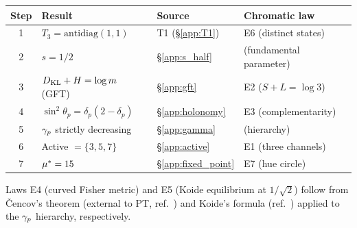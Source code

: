 \documentclass[12pt,a4paper]{article}
\begin{document}
\begin{center}
\small
\begin{tabular}{clll}
\toprule
\textbf{Step} & \textbf{Result} & \textbf{Source} & \textbf{Chromatic law} \\
\midrule
1 & $T_3 = \mathrm{antidiag}(1,1)$ & T1 (\S\ref{app:T1}) & E6 (distinct states) \\
2 & $s = 1/2$ & \S\ref{app:s_half} & (fundamental parameter) \\
3 & $D_{\mathrm{KL}} + H = \log m$ (GFT) & \S\ref{app:gft} & E2 ($S + L = \log 3$) \\
4 & $\sin^2\!\theta_p = \delta_p(2-\delta_p)$ & \S\ref{app:holonomy} & E3 (complementarity) \\
5 & $\gamma_{p}$ strictly decreasing & \S\ref{app:gamma} & (hierarchy) \\
6 & Active $= \{3,5,7\}$ & \S\ref{app:active} & E1 (three channels) \\
7 & ${\mu^{*}} = 15$ & \S\ref{app:fixed_point} & E7 (hue circle) \\
\bottomrule
\end{tabular}
\end{center}

\noindent
Laws E4 (curved Fisher metric) and E5 (Koide equilibrium at
$1/\sqrt{2}$) follow from \v{C}encov's theorem (external to PT,
ref.~\cite{cencov1982}) and Koide's formula (ref.~\cite{koide1981})
applied to the $\gamma_{p}$ hierarchy, respectively.
\end{document}
